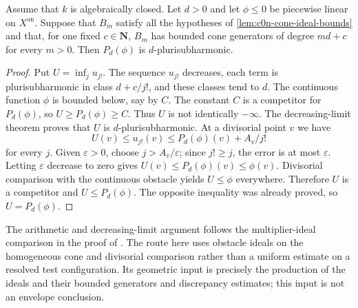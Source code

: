 \begin{theorem}
\label{thm:c0n-cone-envelope-assembly}
\leanok
Assume that $k$ is algebraically closed.  Let $d>0$ and let $\phi\le0$ be
piecewise linear on $X^{\mathrm{an}}$.  Suppose that $B_m$ satisfy all the
hypotheses of \cref{lem:c0n-cone-ideal-bounds} and that, for one fixed
$c\in\mathbf N$, $B_m$ has bounded cone generators of degree $md+c$ for
every $m>0$.  Then $P_d(\phi)$ is $d$-plurisubharmonic.
\end{theorem}
\begin{proof}
Put $U=\inf_j u_{j!}$.  The sequence $u_{j!}$ decreases, each term is
plurisubharmonic in class $d+c/j!$, and these classes tend to $d$.
The continuous function $\phi$ is bounded below, say by $C$.
The constant $C$ is a competitor for $P_d(\phi)$, so
$U\ge P_d(\phi)\ge C$.  Thus $U$ is not identically $-\infty$.
The decreasing-limit theorem proves that $U$ is $d$-plurisubharmonic.
At a divisorial point $v$ we have
\[
 U(v)\le u_{j!}(v)\le P_d(\phi)(v)+A_v/j!
\]
for every $j$.  Given $\varepsilon>0$, choose $j>A_v/\varepsilon$;
since $j!\ge j$, the error is at most $\varepsilon$.  Letting
$\varepsilon$ decrease to zero gives $U(v)\le P_d(\phi)(v)\le\phi(v)$.
Divisorial comparison with the continuous obstacle yields $U\le\phi$
everywhere.  Therefore $U$ is a competitor and $U\le P_d(\phi)$.
The opposite inequality was already proved, so $U=P_d(\phi)$.
\end{proof}

\begin{remark}
The arithmetic and decreasing-limit argument follows the multiplier-ideal
comparison in the proof of \cite[Theorem~5.20]{BJ22}.  The route here uses
obstacle ideals on the homogeneous cone and divisorial comparison rather
than a uniform estimate on a resolved test configuration.  Its geometric
input is precisely the production of the ideals and their bounded
generators and discrepancy estimates; this input is not an envelope
conclusion.
\end{remark}
